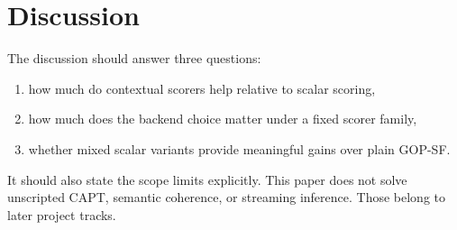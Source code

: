 \section{Discussion}

The discussion should answer three questions:

\begin{enumerate}
  \item how much do contextual scorers help relative to scalar scoring,
  \item how much does the backend choice matter under a fixed scorer family,
  \item whether mixed scalar variants provide meaningful gains over plain GOP-SF.
\end{enumerate}

It should also state the scope limits explicitly. This paper does not solve
unscripted CAPT, semantic coherence, or streaming inference. Those belong to
later project tracks.
